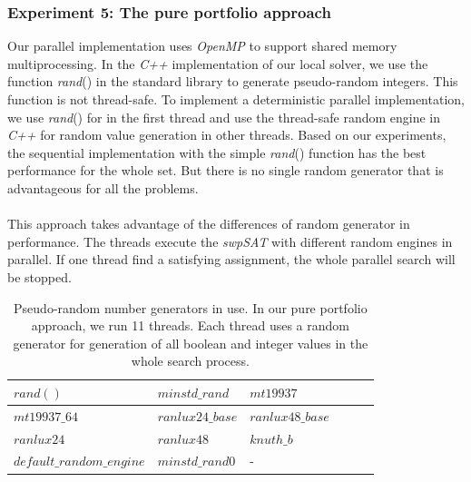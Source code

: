 \documentclass[12pt,a4paper,twoside]{scrartcl}
\numberwithin{equation}{section}
\begin{document}
  \subsubsection{Experiment 5: The pure portfolio approach} 
  \label{sec:Experiment 5}
Our parallel implementation uses \emph{OpenMP} to support shared memory multiprocessing. In the \emph{C++} implementation of our local solver, we use the function \emph{rand}() in the standard library to generate pseudo-random integers. This function is not thread-safe. To implement a deterministic parallel implementation, we use \emph{rand}()  for in the first thread and use the thread-safe random engine in \emph{C++} for random value generation in other threads. Based on our experiments, the sequential implementation with the simple \emph{rand}() function has the best performance for the whole set. But there is no single random generator that is advantageous for all the problems.\\
\\
 This approach takes advantage of the differences of random generator in performance. The threads execute the \emph{swpSAT} with different random engines in parallel. If one thread find a satisfying assignment, the whole parallel search will be stopped.\\
\begin{table}[h!]
\begin{center}
    \begin{tabular}{|l|l|l|l|l|p{1cm}|}
\hline 
$rand()$&$minstd\_rand$&$mt19937$\\ \hline
$mt19937\_64$&$ranlux24\_base$&$ranlux48\_base$\\ \hline
$ranlux24$&$ranlux48$&$knuth\_b$\\ \hline
$default\_random\_engine$&$minstd\_rand0$&-\\ \hline
\end{tabular}
\end{center}
\caption{Pseudo-random number generators in use. In our pure portfolio approach, we run 11 threads. Each thread uses a random generator for generation of all boolean and integer values in the whole search process.}
\end{table} 
\end{document}
